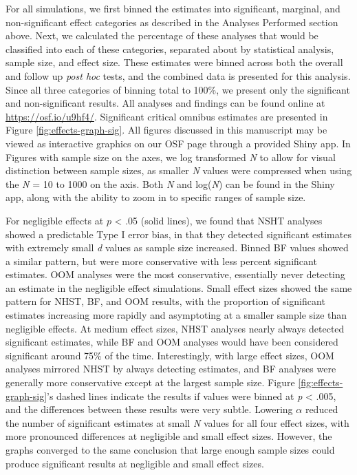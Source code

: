 \documentclass[english,man]{apa6}
\theoremstyle{definition}
\theoremstyle{definition}
\theoremstyle{definition}
\theoremstyle{remark}
\begin{document}
For all simulations, we first binned the estimates into significant,
marginal, and non-significant effect categories as described in the
Analyses Performed section above. Next, we calculated the percentage of
these analyses that would be classified into each of these categories,
separated about by statistical analysis, sample size, and effect size.
These estimates were binned across both the overall and follow up
\emph{post hoc} tests, and the combined data is presented for this
analysis. Since all three categories of binning total to 100\%, we
present only the significant and non-significant results. All analyses
and findings can be found online at \url{https://osf.io/u9hf4/}.
Significant critical omnibus estimates are presented in Figure
\ref{fig:effects-graph-sig}. All figures discussed in this manuscript
may be viewed as interactive graphics on our OSF page through a provided
Shiny app. In Figures with sample size on the axes, we log transformed
\emph{N} to allow for visual distinction between sample sizes, as
smaller \emph{N} values were compressed when using the \emph{N} = 10 to
1000 on the axis. Both \emph{N} and log(\emph{N}) can be found in the
Shiny app, along with the ability to zoom in to specific ranges of
sample size.

For negligible effects at \(p\) \textless{} .05 (solid lines), we found
that NSHT analyses showed a predictable Type I error bias, in that they
detected significant estimates with extremely small \emph{d} values as
sample size increased. Binned BF values showed a similar pattern, but
were more conservative with less percent significant estimates. OOM
analyses were the most conservative, essentially never detecting an
estimate in the negligible effect simulations. Small effect sizes showed
the same pattern for NHST, BF, and OOM results, with the proportion of
significant estimates increasing more rapidly and asymptoting at a
smaller sample size than negligible effects. At medium effect sizes,
NHST analyses nearly always detected significant estimates, while BF and
OOM analyses would have been considered significant around 75\% of the
time. Interestingly, with large effect sizes, OOM analyses mirrored NHST
by always detecting estimates, and BF analyses were generally more
conservative except at the largest sample size. Figure
\ref{fig:effects-graph-sig}'s dashed lines indicate the results if
values were binned at \emph{p} \textless{} .005, and the differences
between these results were very subtle. Lowering \(\alpha\) reduced the
number of significant estimates at small \emph{N} values for all four
effect sizes, with more pronounced differences at negligible and small
effect sizes. However, the graphs converged to the same conclusion that
large enough sample sizes could produce significant results at
negligible and small effect sizes.
\end{document}

